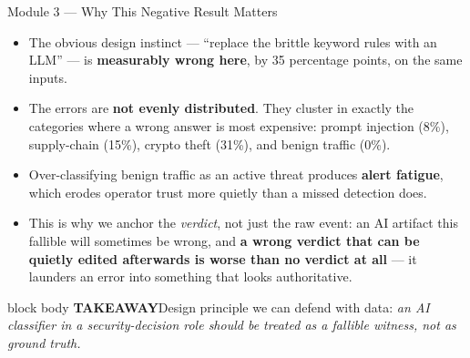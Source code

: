 \documentclass[aspectratio=169,11pt]{beamer}
\newcommand{\takeaway}[1]{%
  \vspace{3pt}%
  \begin{beamercolorbox}[wd=\dimexpr\textwidth-10pt\relax,sep=5pt,rounded=true]{block body}%
    {\color{navy}\bfseries\scriptsize TAKEAWAY\;\;}{\scriptsize #1}%
  \end{beamercolorbox}}
\begin{document}
\begin{frame}{Module 3 --- Why This Negative Result Matters}
  \footnotesize
  \begin{itemize}\setlength\itemsep{4pt}
    \item The obvious design instinct --- ``replace the brittle keyword rules with an LLM'' --- is
      \textbf{measurably wrong here}, by 35 percentage points, on the same inputs.
    \item The errors are \textbf{not evenly distributed}. They cluster in exactly the categories where a
      wrong answer is most expensive: prompt injection (8\%), supply-chain (15\%), crypto theft (31\%),
      and benign traffic (0\%).
    \item Over-classifying benign traffic as an active threat produces \textbf{alert fatigue}, which
      erodes operator trust more quietly than a missed detection does.
    \item This is why we anchor the \emph{verdict}, not just the raw event: an AI artifact this fallible
      will sometimes be wrong, and \textbf{a wrong verdict that can be quietly edited afterwards is worse
      than no verdict at all} --- it launders an error into something that looks authoritative.
  \end{itemize}
  \takeaway{Design principle we can defend with data: \emph{an AI classifier in a security-decision role should be treated as a fallible witness, not as ground truth.}}
\end{frame}
\end{document}
